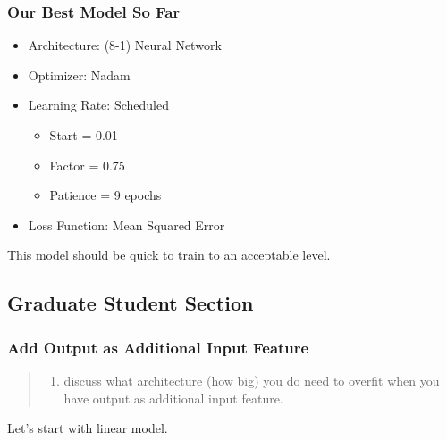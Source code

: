 \documentclass[11pt]{article}
\providecommand{\tightlist}{%
      \setlength{\itemsep}{0pt}\setlength{\parskip}{0pt}}
\begin{document}
\subsubsection{Our Best Model So Far}\label{our-best-model-so-far}

\begin{itemize}
\tightlist
\item
  Architecture: (8-1) Neural Network
\item
  Optimizer: Nadam
\item
  Learning Rate: Scheduled

  \begin{itemize}
  \tightlist
  \item
    Start = 0.01
  \item
    Factor = 0.75
  \item
    Patience = 9 epochs
  \end{itemize}
\item
  Loss Function: Mean Squared Error
\end{itemize}

This model should be quick to train to an acceptable level.

    \subsection{Graduate Student Section}\label{graduate-student-section}

\subsubsection{Add Output as Additional Input
Feature}\label{add-output-as-additional-input-feature}

\begin{quote}
\begin{enumerate}
\def\labelenumi{\arabic{enumi})}
\tightlist
\item
  discuss what architecture (how big) you do need to overfit when you
  have output as additional input feature.
\end{enumerate}
\end{quote}

Let's start with linear model.
\end{document}

